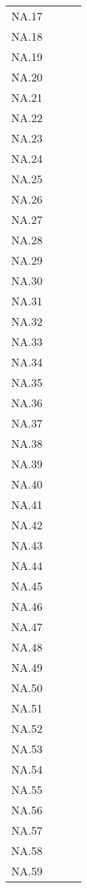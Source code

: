 \begin{table}[ht]
\begin{tabular}{rrrr}
  NA.17 &  &  &  \\ 
  NA.18 &  &  &  \\ 
  NA.19 &  &  &  \\ 
  NA.20 &  &  &  \\ 
  NA.21 &  &  &  \\ 
  NA.22 &  &  &  \\ 
  NA.23 &  &  &  \\ 
  NA.24 &  &  &  \\ 
  NA.25 &  &  &  \\ 
  NA.26 &  &  &  \\ 
  NA.27 &  &  &  \\ 
  NA.28 &  &  &  \\ 
  NA.29 &  &  &  \\ 
  NA.30 &  &  &  \\ 
  NA.31 &  &  &  \\ 
  NA.32 &  &  &  \\ 
  NA.33 &  &  &  \\ 
  NA.34 &  &  &  \\ 
  NA.35 &  &  &  \\ 
  NA.36 &  &  &  \\ 
  NA.37 &  &  &  \\ 
  NA.38 &  &  &  \\ 
  NA.39 &  &  &  \\ 
  NA.40 &  &  &  \\ 
  NA.41 &  &  &  \\ 
  NA.42 &  &  &  \\ 
  NA.43 &  &  &  \\ 
  NA.44 &  &  &  \\ 
  NA.45 &  &  &  \\ 
  NA.46 &  &  &  \\ 
  NA.47 &  &  &  \\ 
  NA.48 &  &  &  \\ 
  NA.49 &  &  &  \\ 
  NA.50 &  &  &  \\ 
  NA.51 &  &  &  \\ 
  NA.52 &  &  &  \\ 
  NA.53 &  &  &  \\ 
  NA.54 &  &  &  \\ 
  NA.55 &  &  &  \\ 
  NA.56 &  &  &  \\ 
  NA.57 &  &  &  \\ 
  NA.58 &  &  &  \\ 
  NA.59 &  &  &  \\ 

\end{tabular}
\end{table}
